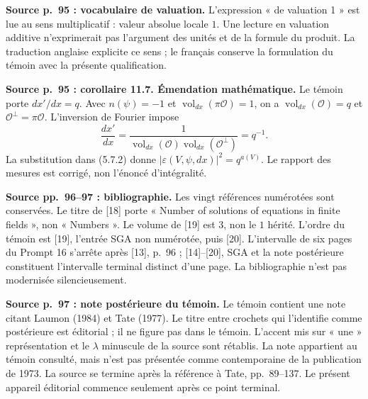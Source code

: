 \documentclass[10pt,letterpaper]{article}
\begin{document}
\begin{description}[style=nextline,leftmargin=2.6em,labelwidth=2.2em,font=\normalfont\bfseries]
\item[E12] \textbf{Source p.~95 : vocabulaire de valuation.} L'expression « de valuation 1 » est lue au sens multiplicatif : valeur absolue locale \(1\). Une lecture en valuation additive n'exprimerait pas l'argument des unités et de la formule du produit. La traduction anglaise explicite ce sens ; le français conserve la formulation du témoin avec la présente qualification.

\item[E13] \textbf{Source p.~95 : corollaire 11.7. Émendation mathématique.} Le témoin porte \(dx'/dx=q\). Avec \(n(\psi)=-1\) et \(\operatorname{vol}_{dx}(\pi\mathcal O)=1\), on a \(\operatorname{vol}_{dx}(\mathcal O)=q\) et \(\mathcal O^\perp=\pi\mathcal O\). L'inversion de Fourier impose
\[
 \frac{dx'}{dx}=\frac{1}{\operatorname{vol}_{dx}(\mathcal O)\operatorname{vol}_{dx}(\mathcal O^\perp)}=q^{-1}.
\]
La substitution dans (5.7.2) donne \( |\varepsilon(V,\psi,dx)|^2=q^{a(V)}\). Le rapport des mesures est corrigé, non l'énoncé d'intégralité.

\item[E14] \textbf{Source pp.~96--97 : bibliographie.} Les vingt références numérotées sont conservées. Le titre de [18] porte « Number of solutions of equations in finite fields », non « Numbers ». Le volume de [19] est \(3\), non le \(1\) hérité. L'ordre du témoin est [19], l'entrée SGA non numérotée, puis [20]. L'intervalle de six pages du Prompt 16 s'arrête après [13], p.~96 ; [14]--[20], SGA et la note postérieure constituent l'intervalle terminal distinct d'une page. La bibliographie n'est pas modernisée silencieusement.

\item[E15] \textbf{Source p.~97 : note postérieure du témoin.} Le témoin contient une note citant Laumon (1984) et Tate (1977). Le titre entre crochets qui l'identifie comme postérieure est éditorial ; il ne figure pas dans le témoin. L'accent mis sur « une » représentation et le \(\lambda\) minuscule de la source sont rétablis. La note appartient au témoin consulté, mais n'est pas présentée comme contemporaine de la publication de 1973. La source se termine après la référence à Tate, pp.~89--137. Le présent appareil éditorial commence seulement après ce point terminal.


\end{description}
\end{document}
